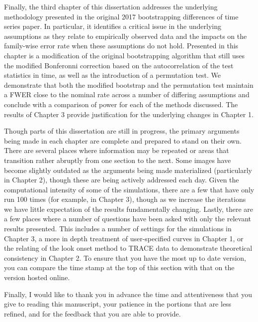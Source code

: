 \documentclass{article}
\begin{document}
Finally, the third chapter of this dissertation addresses the underlying methodology presented in the original 2017 bootstrapping differences of time series paper. In particular, it identifies a critical issue in the underlying assumptions as they relate to empirically observed data and the impacts on the family-wise error rate when these assumptions do not hold. Presented in this chapter is a modification of the original bootstrapping algorithm that still uses the modified Bonferonni correction based on the autocorrelation of the test statistics in time, as well as the introduction of a permutation test. We demonstrate that both the modified bootstrap and the permutation test maintain a FWER close to the nominal rate across a number of differing assumptions and conclude with a comparison of power for each of the methods discussed. The results of Chapter 3 provide justification for the underlying changes in Chapter 1. 

Though parts of this dissertation are still in progress, the primary arguments being made in each chapter are complete and prepared to stand on their own. There are several places where information may be repeated or areas that transition rather abruptly from one section to the next. Some images have become slightly outdated as the arguments being made materialized (particularly in Chapter 2), though these are being actively addressed each day. Given the computational intensity of some of the simulations, there are a few that have only run 100 times (for example, in Chapter 3), though as we increase the iterations we have little expectation of the results fundamentally changing. Lastly, there are a few places where a number of questions have been asked with only the relevant results presented. This includes a number of settings for the simulations in Chapter 3, a more in depth treatment of user-specified curves in Chapter 1, or the relating of the look onset method to TRACE data to demonstrate theoretical consistency in Chapter 2. To ensure that you have the most up to date version, you can compare the time stamp at the top of this section with that on the version hosted online.

Finally, I would like to thank you in advance the time and attentiveness that you give to reading this manuscript, your patience in the portions that are less refined, and for the feedback that you are able to provide. 



%
%
%
%
%
%
%
%
%
%
\end{document}
